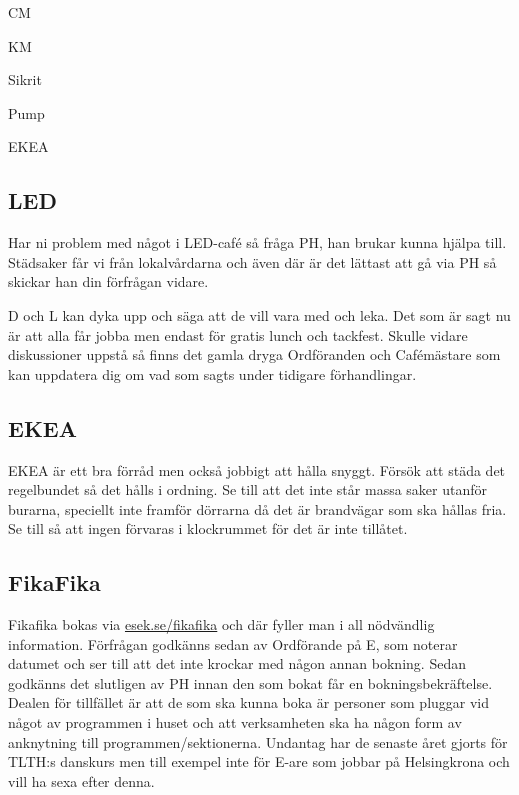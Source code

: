 \documentclass[10pt]{article}
\begin{document}
\begin{dashlist}
\item CM
\item KM
\item Sikrit
\item Pump
\item EKEA
\end{dashlist}

\subsection{LED}

Har ni problem med något i LED-café så fråga PH, han brukar kunna hjälpa till. Städsaker får vi från lokalvårdarna och även där är det lättast att gå via PH så skickar han din förfrågan vidare.

D och L kan dyka upp och säga att de vill vara med och leka. Det som är sagt nu är att alla får jobba men endast för gratis lunch och tackfest. Skulle vidare diskussioner uppstå så finns det gamla dryga Ordföranden och Cafémästare som kan uppdatera dig om vad som sagts under tidigare förhandlingar.

\subsection{EKEA}

EKEA är ett bra förråd men också jobbigt att hålla snyggt. Försök att städa det regelbundet så det hålls i ordning. Se till att det inte står massa saker utanför burarna, speciellt inte framför dörrarna då det är brandvägar som ska hållas fria. Se till så att ingen förvaras i klockrummet för det är inte tillåtet.

\subsection{FikaFika}

Fikafika bokas via \url{esek.se/fikafika} och där fyller man i all nödvändlig information. Förfrågan godkänns sedan av Ordförande på E, som noterar datumet och ser till att det inte krockar med någon annan bokning. Sedan godkänns det slutligen av PH innan den som bokat får en bokningsbekräftelse. Dealen för tillfället är att de som ska kunna boka är personer som pluggar vid något av programmen i huset och att verksamheten ska ha någon form av anknytning till programmen/sektionerna. Undantag har de senaste året gjorts för TLTH:s danskurs men till exempel inte för E-are som jobbar på Helsingkrona och vill ha sexa efter denna.
\end{document}
